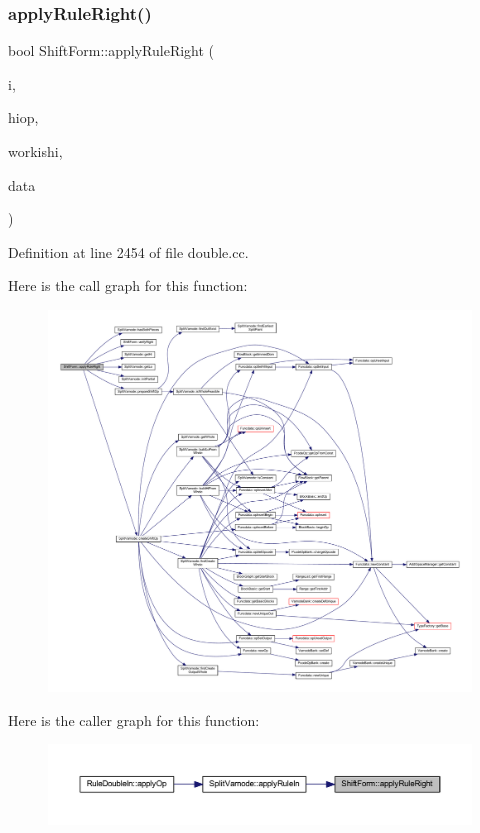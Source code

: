 \subsubsection{\texorpdfstring{applyRuleRight()}{applyRuleRight()}}
{\footnotesize\ttfamily bool Shift\+Form\+::apply\+Rule\+Right (\begin{DoxyParamCaption}\item[{\mbox{\hyperlink{class_split_varnode}{Split\+Varnode}} \&}]{i,  }\item[{\mbox{\hyperlink{class_pcode_op}{Pcode\+Op}} $\ast$}]{hiop,  }\item[{bool}]{workishi,  }\item[{\mbox{\hyperlink{class_funcdata}{Funcdata}} \&}]{data }\end{DoxyParamCaption})}



Definition at line 2454 of file double.\+cc.

Here is the call graph for this function\+:
\nopagebreak
\begin{figure}[H]
\begin{center}
\leavevmode
\includegraphics[width=350pt]{class_shift_form_a2e6fa85729963eb0c4ae531edcc38d45_cgraph}
\end{center}
\end{figure}
Here is the caller graph for this function\+:
\nopagebreak
\begin{figure}[H]
\begin{center}
\leavevmode
\includegraphics[width=350pt]{class_shift_form_a2e6fa85729963eb0c4ae531edcc38d45_icgraph}
\end{center}
\end{figure}
\mbox{\label{class_shift_form_ae52dfd26b10069bcfab400b66d5b71eb}} 
